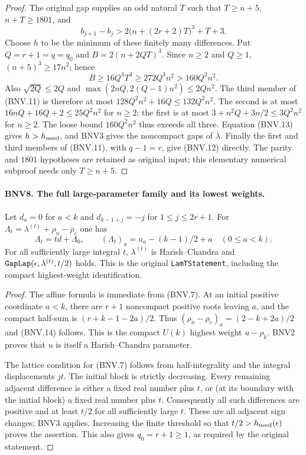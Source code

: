 \documentclass[11pt,a4paper]{article}
\numberwithin{equation}{section}
\theoremstyle{remark}\newtheorem{remark}[theorem]{Remark}
\begin{document}
\begin{proof}
The original gap supplies an odd natural $T$ such that $T\ge n+5$,
$n+T\ge1801$, and
\[
 b_{j+1}-b_j>2\bigl(n+(2r+2)T\bigr)^3+T+3.
 \tag{BNV.13}
\]
Choose $h$ to be the minimum of these finitely many differences.  Put
$Q=r+1=q=q_0$ and $B=2(n+2QT)^3$.  Since $n\ge2$ and $Q\ge1$,
$(n+5)^3\ge17n^2$; hence
\[
 B\ge16Q^3T^3\ge272Q^3n^2>160Q^2n^2.
\]
Also $\sqrt{2Q}\le2Q$ and
$\max(2nQ,2(Q-1)n^2)\le2Qn^2$.  The third member of (BNV.11) is
therefore at most
$128Q^2n^2+16Q\le132Q^2n^2$.
The second is at most $16nQ+16Q+2\le25Q^2n^2$ for $n\ge2$;
the first is at most $3+n^2Q+3n/2\le3Q^2n^2$ for $n\ge2$.
The loose bound $160Q^2n^2$ thus exceeds all three.  Equation (BNV.13)
gives $h>h_{\rm need}$, and BNV3 gives the noncompact gaps of $\lambda$.
Finally the first and third members of (BNV.11), with $q-1=r$, give
(BNV.12) directly.  The parity and $1801$ hypotheses are retained as
original input; this elementary numerical subproof needs only $T\ge n+5$.
\end{proof}

\paragraph{BNV8. The full large-parameter family and its lowest weights.}
\label{claim:BNV8}
Let $d_a=0$ for $a<k$ and $d_{k-1+j}=-j$ for $1\le j\le2r+1$.
For $\Lambda_t=\lambda^{(t)}+\rho_n-\rho_c$ one has
\[
 \Lambda_t=t d+\Lambda_0,\qquad
 (\Lambda_t)_a=u_a-(k-1)/2+a\quad(0\le a<k).
 \tag{BNV.14}
\]
For all sufficiently large integral $t$, $\lambda^{(t)}$ is
Harish--Chandra and
$\texttt{Gap\allowbreak Lap}(\epsilon,\lambda^{(t)},t/2)$ holds.  This is the original
\texttt{Lam\allowbreak TStatement}, including the compact highest-weight identification.

\begin{proof}
The affine formula is immediate from (BNV.7).  At an initial positive
coordinate $a<k$, there are $r+1$ noncompact positive roots leaving $a$,
and the compact half-sum is $(r+k-1-2a)/2$.  Thus
$(\rho_n-\rho_c)_a=(2-k+2a)/2$ and (BNV.14) follows.
This is the compact $U(k)$ highest weight $u-\rho_k$.  BNV2 proves that
$u$ is itself a Harish--Chandra parameter.

The lattice condition for (BNV.7) follows from half-integrality and the
integral displacements $jt$.  The initial block is strictly decreasing.
Every remaining adjacent difference is either a fixed real number plus
$t$, or (at its boundary with the initial block) a fixed real number plus
$t$.  Consequently all such differences are positive and at least $t/2$
for all sufficiently large $t$.  These are all adjacent sign changes;
BNV3 applies.  Increasing the finite threshold so that
$t/2>h_{\rm need}(\epsilon)$ proves the assertion.  This also gives
$q_0=r+1\ge1$, as required by the original statement.
\end{proof}
\end{document}
